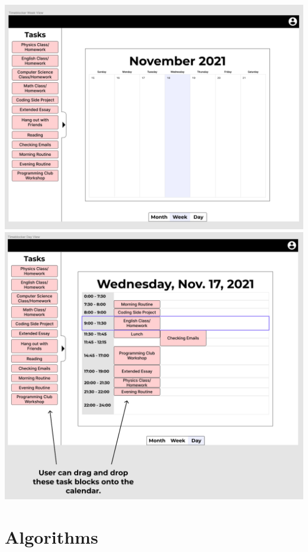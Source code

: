 \documentclass[12pt]{report}
\begin{document}
\includegraphics[width=\textwidth]{week-view.png}
\includegraphics[width=\textwidth]{day-view.png}

\newpage

\section*{Algorithms}
\end{document}
